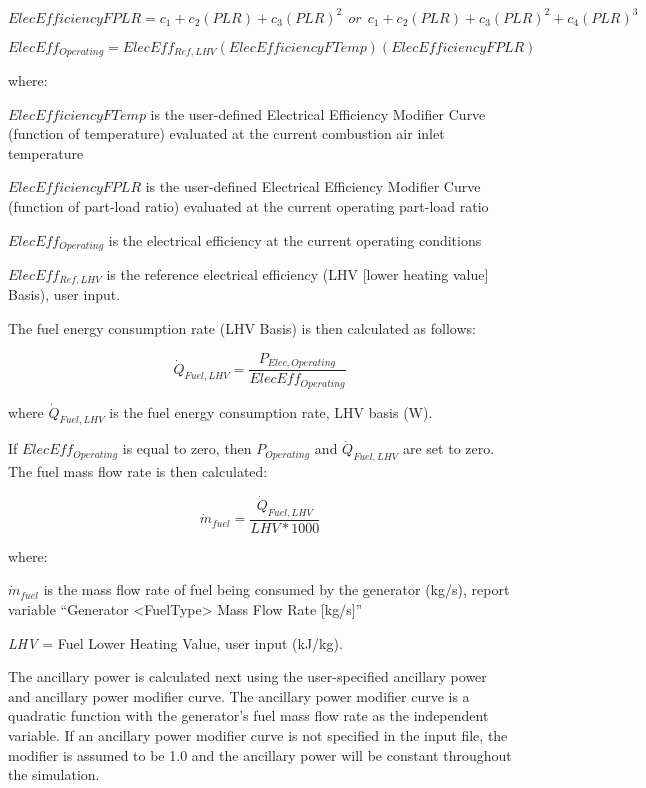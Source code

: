 \begin{equation}
ElecEfficiencyFPLR = {c_1} + {c_2}\left( {PLR} \right) + {c_3}{\left( {PLR} \right)^2}~~or~~{c_1} + {c_2}\left( {PLR} \right) + {c_3}{\left( {PLR} \right)^2} + {c_4}{\left( {PLR} \right)^3}
\end{equation}

\begin{equation}
ElecEf{f_{Operating}} = ElecEf{f_{Ref,LHV}}\left( {ElecEfficiencyFTemp} \right)\left( {ElecEfficiencyFPLR} \right)
\end{equation}

where:

\(ElecEfficiencyFTemp\) is the user-defined Electrical Efficiency Modifier Curve (function of temperature) evaluated at the current combustion air inlet temperature

\(ElecEfficiencyFPLR\) is the user-defined Electrical Efficiency Modifier Curve (function of part-load ratio) evaluated at the current operating part-load ratio

\(ElecEf{f_{Operating}}\) is the electrical efficiency at the current operating conditions

\(ElecEf{f_{Ref,LHV}}\) is the reference electrical efficiency (LHV {[}lower heating value{]} Basis), user input.

The fuel energy consumption rate (LHV Basis) is then calculated as follows:

\begin{equation}
\dot{Q}_{Fuel,LHV} = \frac{P_{Elec,Operating}}{ElecEff_{Operating}}
\end{equation}

where \({\dot Q_{Fuel,LHV}}\) is the fuel energy consumption rate, LHV basis (W).

If \(ElecEff_{Operating}\) is equal to zero, then \(P_{Operating}\) and \({\dot Q_{Fuel,LHV}}\) are set to zero. The fuel mass flow rate is then calculated:

\begin{equation}
\dot{m}_{fuel} = \frac{\dot{Q}_{Fuel,LHV}}{LHV*1000}
\end{equation}

where:

\({\dot m_{fuel}}\) is the mass flow rate of fuel being consumed by the generator (kg/s), report variable ``Generator \textless{}FuelType\textgreater{} Mass Flow Rate {[}kg/s{]}''

\emph{LHV} = Fuel Lower Heating Value, user input (kJ/kg).

The ancillary power is calculated next using the user-specified ancillary power and ancillary power modifier curve. The ancillary power modifier curve is a quadratic function with the generator's fuel mass flow rate as the independent variable. If an ancillary power modifier curve is not specified in the input file, the modifier is assumed to be 1.0 and the ancillary power will be constant throughout the simulation.

